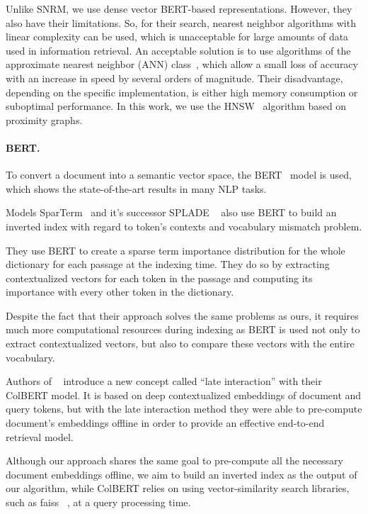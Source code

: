 \documentclass[
    twocolumn,
]{template/ceurart}
\begin{document}
    Unlike SNRM, we use dense vector BERT-based representations.
    However, they also have their limitations.
    So, for their search, nearest neighbor algorithms with linear complexity can be used,
    which is unacceptable for large amounts of data used in information retrieval.
    An acceptable solution is to use algorithms of the approximate nearest neighbor (ANN) class~\cite{ann},
    which allow a small loss of accuracy with an increase in speed by several orders of magnitude.
    Their disadvantage, depending on the specific implementation,
    is either high memory consumption or suboptimal performance.
    In this work, we use the HNSW~\cite{hnsw} algorithm based on proximity graphs.

    \paragraph{BERT.}
    To convert a document into a semantic vector space, the BERT~\cite{devlin2018bert} model is used,
    which shows the state-of-the-art results in many NLP tasks.

    Models SparTerm~\cite{sparTerm} and it's successor SPLADE ~\cite{splade} also use BERT to build an inverted
    index with regard to token's contexts and vocabulary mismatch problem.

    They use BERT to create a sparse term importance distribution for the whole dictionary for each passage at the indexing time.
    They do so by extracting contextualized vectors for each token in the passage and computing its importance with every other
    token in the dictionary.

    Despite the fact that their approach solves the same problems as ours, it requires much more computational resources during indexing
    as BERT is used not only to extract contextualized vectors, but also to compare these vectors with the
    entire vocabulary.

    Authors of ~\cite{colbert} introduce a new concept called ``late interaction'' with their ColBERT model.
    It is based on deep contextualized embeddings of document and query tokens, but with the late interaction
    method they were able to pre-compute document's embeddings offline in order to provide an effective end-to-end retrieval model.

    Although our approach shares the same goal to pre-compute all the necessary document embeddings offline, we aim to
    build an inverted index as the output of our algorithm, while ColBERT relies on using vector-similarity search libraries,
    such as faiss ~\cite{faiss}, at a query processing time.
\end{document}

